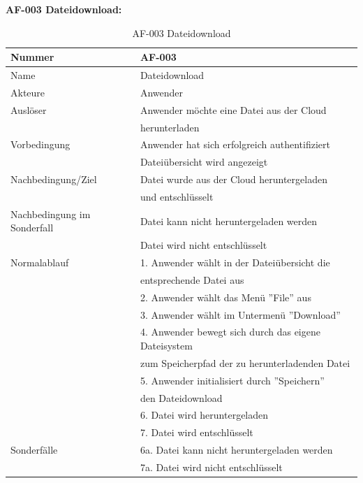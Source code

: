 \documentclass[12pt,a4paper,bibliography=totocnumbered,listof=totocnumbered]{scrartcl}
\begin{document}
\textbf{AF-003 Dateidownload:}
\begin{table}[!h]
	\centering
	\begin{tabular}{|l|l|}
		\hline
		Nummer & AF-003\\
		\hline
		Name & Dateidownload\\
		\hline
		Akteure & Anwender\\
		\hline
		Auslöser & Anwender möchte eine Datei aus der Cloud \\ & herunterladen\\
		\hline
		Vorbedingung & Anwender hat sich erfolgreich authentifiziert \\ & Dateiübersicht wird angezeigt\\
		\hline
		Nachbedingung/Ziel & Datei wurde aus der Cloud heruntergeladen \\ & und entschlüsselt \\
		\hline
		Nachbedingung im Sonderfall & Datei kann nicht heruntergeladen werden \\ & Datei wird nicht entschlüsselt\\
		\hline
		Normalablauf & 1. Anwender wählt in der Dateiübersicht die \\ & entsprechende Datei aus \\ & 2. Anwender wählt das Menü ''File'' aus \\ & 3. Anwender wählt im Untermenü ''Download'' \\ & 4. Anwender bewegt sich durch das eigene Dateisystem \\ & zum Speicherpfad der zu herunterladenden Datei \\ & 5. Anwender initialisiert durch ''Speichern'' \\ & den Dateidownload \\  & 6. Datei wird heruntergeladen \\ & 7. Datei wird entschlüsselt \\
		\hline
		Sonderfälle & 6a. Datei kann nicht heruntergeladen werden \\ & 7a. Datei wird nicht entschlüsselt\\
		\hline
	\end{tabular}
	\caption{AF-003 Dateidownload}
	\label{tab:AF-003 Dateidownload}
\end{table}
\end{document}
